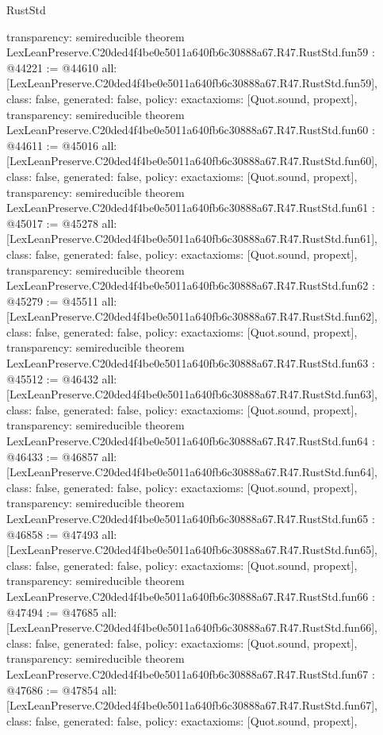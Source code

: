 \begin{lexlean}{RustStd}
\begin{coremodule}
{  transparency: semireducible
}
theorem LexLeanPreserve.C20ded4f4be0e5011a640fb6c30888a67.R47.RustStd.fun59 : @44221 := @44610 {
  all: [LexLeanPreserve.C20ded4f4be0e5011a640fb6c30888a67.R47.RustStd.fun59],
  class: false,
  generated: false,
  policy: exact{axioms: [Quot.sound, propext]},
  transparency: semireducible
}
theorem LexLeanPreserve.C20ded4f4be0e5011a640fb6c30888a67.R47.RustStd.fun60 : @44611 := @45016 {
  all: [LexLeanPreserve.C20ded4f4be0e5011a640fb6c30888a67.R47.RustStd.fun60],
  class: false,
  generated: false,
  policy: exact{axioms: [Quot.sound, propext]},
  transparency: semireducible
}
theorem LexLeanPreserve.C20ded4f4be0e5011a640fb6c30888a67.R47.RustStd.fun61 : @45017 := @45278 {
  all: [LexLeanPreserve.C20ded4f4be0e5011a640fb6c30888a67.R47.RustStd.fun61],
  class: false,
  generated: false,
  policy: exact{axioms: [Quot.sound, propext]},
  transparency: semireducible
}
theorem LexLeanPreserve.C20ded4f4be0e5011a640fb6c30888a67.R47.RustStd.fun62 : @45279 := @45511 {
  all: [LexLeanPreserve.C20ded4f4be0e5011a640fb6c30888a67.R47.RustStd.fun62],
  class: false,
  generated: false,
  policy: exact{axioms: [Quot.sound, propext]},
  transparency: semireducible
}
theorem LexLeanPreserve.C20ded4f4be0e5011a640fb6c30888a67.R47.RustStd.fun63 : @45512 := @46432 {
  all: [LexLeanPreserve.C20ded4f4be0e5011a640fb6c30888a67.R47.RustStd.fun63],
  class: false,
  generated: false,
  policy: exact{axioms: [Quot.sound, propext]},
  transparency: semireducible
}
theorem LexLeanPreserve.C20ded4f4be0e5011a640fb6c30888a67.R47.RustStd.fun64 : @46433 := @46857 {
  all: [LexLeanPreserve.C20ded4f4be0e5011a640fb6c30888a67.R47.RustStd.fun64],
  class: false,
  generated: false,
  policy: exact{axioms: [Quot.sound, propext]},
  transparency: semireducible
}
theorem LexLeanPreserve.C20ded4f4be0e5011a640fb6c30888a67.R47.RustStd.fun65 : @46858 := @47493 {
  all: [LexLeanPreserve.C20ded4f4be0e5011a640fb6c30888a67.R47.RustStd.fun65],
  class: false,
  generated: false,
  policy: exact{axioms: [Quot.sound, propext]},
  transparency: semireducible
}
theorem LexLeanPreserve.C20ded4f4be0e5011a640fb6c30888a67.R47.RustStd.fun66 : @47494 := @47685 {
  all: [LexLeanPreserve.C20ded4f4be0e5011a640fb6c30888a67.R47.RustStd.fun66],
  class: false,
  generated: false,
  policy: exact{axioms: [Quot.sound, propext]},
  transparency: semireducible
}
theorem LexLeanPreserve.C20ded4f4be0e5011a640fb6c30888a67.R47.RustStd.fun67 : @47686 := @47854 {
  all: [LexLeanPreserve.C20ded4f4be0e5011a640fb6c30888a67.R47.RustStd.fun67],
  class: false,
  generated: false,
  policy: exact{axioms: [Quot.sound, propext]},
}
\end{coremodule}
\end{lexlean}
